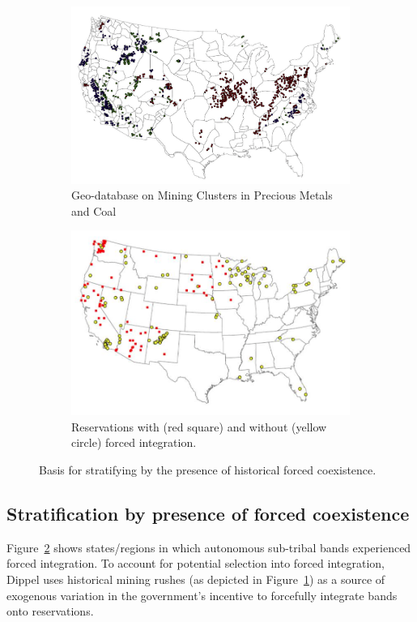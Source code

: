 \documentclass[12pt]{article}
\begin{document}
\begin{figure}[ht!]
\centering
\begin{subfigure}{.5\textwidth}
    \centering
    \includegraphics[scale=0.25]{mining.png}
    \caption{Geo-database on Mining Clusters in Precious Metals and Coal}
    \label{fig:strat:mining}
\end{subfigure}%
\begin{subfigure}{.5\textwidth}
    \centering
    \includegraphics[scale=0.3]{forcedintegration.png}
    \caption{Reservations with (red square) and without (yellow circle) forced integration.}
    \label{fig:strat:reservations}
\end{subfigure}
\caption{Basis for stratifying by the presence of historical forced coexistence.}
\label{fig:strat}
\end{figure}

\subsection{Stratification by presence of forced coexistence}
Figure~\ref{fig:strat:reservations} shows states/regions in which autonomous sub-tribal bands experienced forced integration. 
To account for potential selection into forced integration, Dippel uses historical mining rushes (as depicted in Figure~\ref{fig:strat:mining}) as a source of exogenous variation in the government's incentive to forcefully integrate bands onto reservations. 
\end{document}
